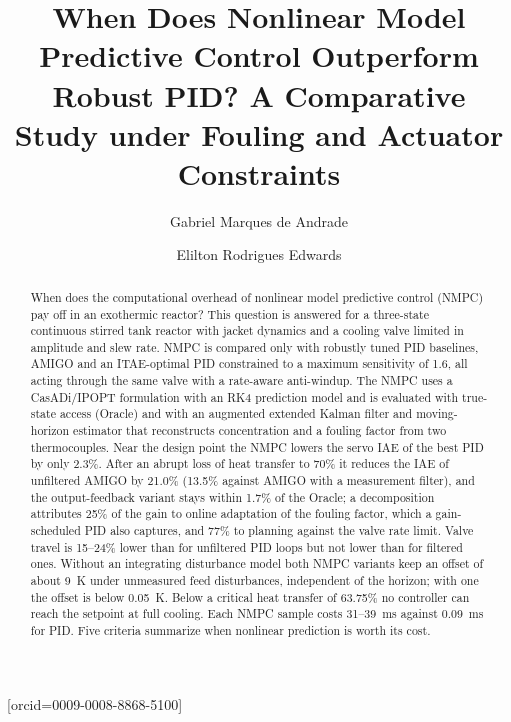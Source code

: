 \documentclass[a4paper,fleqn]{cas-dc}
\begin{document}
\let\WriteBookmarks\relax
\def\floatpagepagefraction{1}
\def\textpagefraction{.001}

\title [mode = title]{When Does Nonlinear Model Predictive Control Outperform Robust PID? A Comparative Study under Fouling and Actuator Constraints}

\author[1]{Gabriel Marques de Andrade}[orcid=0009-0008-8868-5100]
\cormark[1]

\author[1]{Elilton Rodrigues Edwards}



\begin{abstract}
When does the computational overhead of nonlinear model predictive control (NMPC) pay off in an exothermic reactor? This question is answered for a three-state continuous stirred tank reactor with jacket dynamics and a cooling valve limited in amplitude and slew rate. NMPC is compared only with robustly tuned PID baselines, AMIGO and an ITAE-optimal PID constrained to a maximum sensitivity of 1.6, all acting through the same valve with a rate-aware anti-windup. The NMPC uses a CasADi/IPOPT formulation with an RK4 prediction model and is evaluated with true-state access (Oracle) and with an augmented extended Kalman filter and moving-horizon estimator that reconstructs concentration and a fouling factor from two thermocouples. Near the design point the NMPC lowers the servo IAE of the best PID by only 2.3\%. After an abrupt loss of heat transfer to 70\% it reduces the IAE of unfiltered AMIGO by 21.0\% (13.5\% against AMIGO with a measurement filter), and the output-feedback variant stays within 1.7\% of the Oracle; a decomposition attributes 25\% of the gain to online adaptation of the fouling factor, which a gain-scheduled PID also captures, and 77\% to planning against the valve rate limit. Valve travel is 15--24\% lower than for unfiltered PID loops but not lower than for filtered ones. Without an integrating disturbance model both NMPC variants keep an offset of about 9~K under unmeasured feed disturbances, independent of the horizon; with one the offset is below 0.05~K. Below a critical heat transfer of 63.75\% no controller can reach the setpoint at full cooling. Each NMPC sample costs 31--39~ms against 0.09~ms for PID. Five criteria summarize when nonlinear prediction is worth its cost.
\end{abstract}
\end{document}
